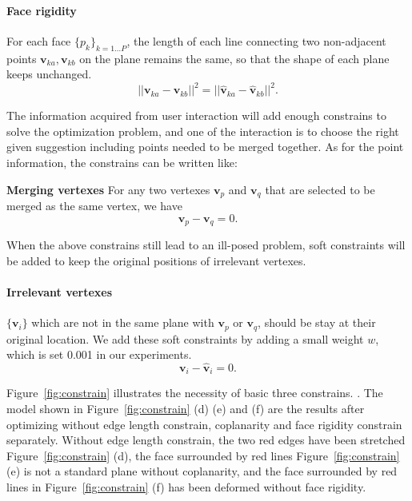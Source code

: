 \paragraph{Face rigidity} For each face $\{p_k\}_{k=1 \dots P}$, the length of each line connecting two non-adjacent points $\mathbf{v}_{ka}, \mathbf{v}_{kb}$ on the plane remains the same, so that the shape of each plane keeps unchanged.
\begin{equation}
||\mathbf{v}_{ka} - \mathbf{v}_{kb}||^2 = ||\hat{\mathbf{v}}_{ka} - \hat{\mathbf{v}}_{kb}||^2.
\label{equ:plane}
\end{equation}

The information acquired from user interaction will add enough constrains to solve the optimization problem, and one of the interaction is to choose the right given suggestion including points needed to be merged together. As for the point information, the constrains can be written like:

\noindent
\textbf{Merging vertexes} For any two vertexes $\mathbf{v}_p$ and $\mathbf{v}_q$ that are selected to be merged as the same vertex, we have 
\begin{equation}
\mathbf{v}_p - \mathbf{v}_q = 0.
\label{equ:point}
\end{equation}


When the above constrains still lead to an ill-posed problem, soft constraints will be added to keep the original positions of irrelevant vertexes. 


\paragraph{Irrelevant vertexes} $\{\mathbf{v}_i\}$ which are not in the same plane with $\mathbf{v}_p$ or $\mathbf{v}_q$, should be stay at their original location. 
We add these soft constraints by adding a small weight $w$, which is set 0.001 in our experiments. 
\begin{equation}
\mathbf{v}_i - \mathbf{\hat{v}}_i = 0.
\label{equ:irrelevant}
\end{equation}

Figure~\ref{fig:constrain} illustrates the necessity of basic three constrains.
{. The model shown in Figure~\ref{fig:constrain} (d) (e) and (f) are the results after optimizing without edge length constrain, coplanarity and face rigidity constrain separately. Without edge length constrain, the two red edges have been stretched Figure~\ref{fig:constrain} (d), the face surrounded by red lines Figure~\ref{fig:constrain} (e) is not a standard plane without coplanarity, and the face surrounded by red lines in Figure~\ref{fig:constrain} (f) has been deformed without face rigidity.}

